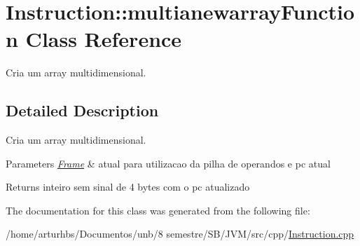 \hypertarget{classInstruction_1_1multianewarrayFunction}{}\section{Instruction\+:\+:multianewarray\+Function Class Reference}
\label{classInstruction_1_1multianewarrayFunction}


Cria um array multidimensional.  




\subsection{Detailed Description}
Cria um array multidimensional. 


\begin{DoxyParams}{Parameters}
{\em \hyperlink{classFrame}{Frame}} & atual para utilizacao da pilha de operandos e pc atual \\
\hline
\end{DoxyParams}
\begin{DoxyReturn}{Returns}
inteiro sem sinal de 4 bytes com o pc atualizado 
\end{DoxyReturn}


The documentation for this class was generated from the following file\+:\begin{DoxyCompactItemize}
\item 
/home/arturhbs/\+Documentos/unb/8 semestre/\+S\+B/\+J\+V\+M/src/cpp/\hyperlink{Instruction_8cpp}{Instruction.\+cpp}\end{DoxyCompactItemize}
